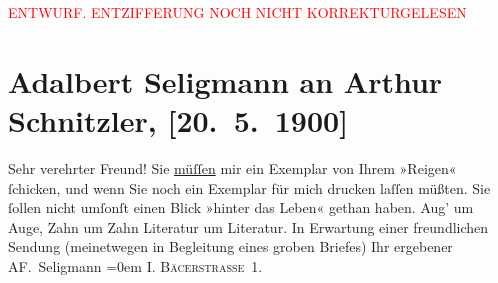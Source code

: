 
\begin{center}
            \textcolor{red}{ENTWURF. ENTZIFFERUNG NOCH NICHT KORREKTURGELESEN}
                      \end{center}
            
               \section[Adalbert Seligmann an Arthur Schnitzler, {[}20. 5. 1900{]}]{ Adalbert Seligmann an Arthur Schnitzler,
                    {[}20. 5. 1900{]}}\nopagebreak{}\rehead{ }\begin{ledgroupsized}[t]{13cm}\normalsize\beginnumbering{} \toendnotes[C]{\smallbreak\pagebreak[2]} 
\pstart{}{\pb}Sehr verehrter
                        Freund!\pend\pstart
           Sie \uline{müſſen} mir ein Exemplar von Ihrem »Reigen« ſchicken, und wenn Sie noch ein
                    Exemplar für mich drucken laſſen müßten. Sie ſollen nicht umſonſt einen Blick
                        »hinter das Leben« gethan haben. Aug’ um
                    Auge, Zahn um Zahn Literatur um Literatur. In Erwartung einer freundlichen
                    Sendung (meinetwegen in Begleitung eines groben Briefes)\pend
           \pstart
           Ihr ergebener{\\[\baselineskip]}\spacefill\mbox{AF. Seligmann}\pend
           \leftskip=0em{}\pstart
           \noindent{}\textsc{I. Bäc\damage{\textcolor{gray}{k}}erstraße 1}.\pend
           \endnumbering{}\end{ledgroupsized}  \newcommand{\dateiname}{L01039}\newcommand{\titel}{Adalbert Seligmann an Arthur Schnitzler, [20. 5. 1900]}\newcommand{\editorInnen}{Martin Anton Müller und Gerd-Hermann Susen}
      
